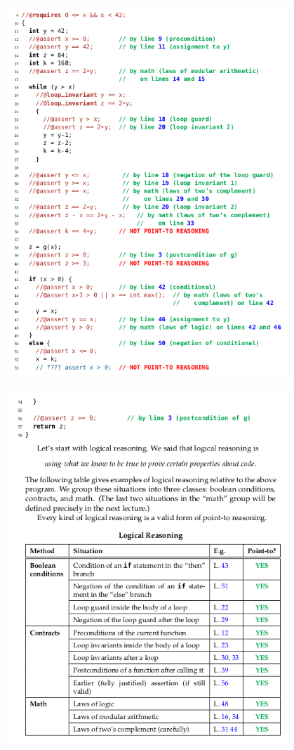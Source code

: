\begin{center}
  \includegraphics[width=0.8\textwidth]{img/reasoning2.png}
\end{center}
\begin{center}
  \includegraphics[width=0.8\textwidth]{img/reasoning3.png}
\end{center}
